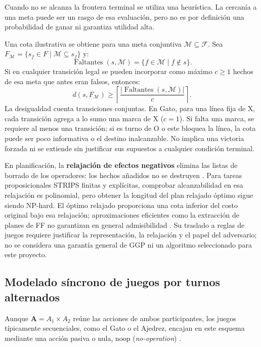 Cuando no se alcanza la frontera terminal se utiliza una heurística. La cercanía a una meta puede ser un rasgo de esa evaluación, pero no es por definición una probabilidad de ganar ni garantiza utilidad alta.

Una cota ilustrativa se obtiene para una meta conjuntiva $\mathcal M\subseteq\mathcal F$. Sea $F_{\mathcal M}=\{s_f\in F\mid\mathcal M\subseteq s_f\}$ y:
\begin{equation}
    \operatorname{Faltantes}(s,\mathcal M)=\{f\in\mathcal M\mid f\notin s\}.
    \label{eq:fluents-faltantes}
\end{equation}
Si en cualquier transición legal se pueden incorporar como máximo $c\ge1$ hechos de esa meta que antes eran falsos, entonces:
\begin{equation}
    d(s,F_{\mathcal M})\ge\left\lceil\frac{|\operatorname{Faltantes}(s,\mathcal M)|}{c}\right\rceil.
    \label{eq:cota-distancia-faltantes}
\end{equation}
La desigualdad cuenta transiciones conjuntas. En Gato, para una línea fija de X, cada transición agrega a lo sumo una marca de X ($c=1$). Si falta una marca, se requiere al menos una transición; si es turno de O o este bloquea la línea, la cota puede ser poco informativa o el destino inalcanzable. No implica una victoria forzada ni se extiende sin justificar sus supuestos a cualquier condición terminal.

En planificación, la \textbf{relajación de efectos negativos} elimina las listas de borrado de los operadores: los hechos añadidos no se destruyen \cite{BonetGeffner2001, HoffmannNebel2001FF}. Para tareas proposicionales STRIPS finitas y explícitas, comprobar alcanzabilidad en esa relajación es polinomial, pero obtener la longitud del plan relajado óptimo sigue siendo NP-hard. El óptimo relajado proporciona una cota inferior del costo original bajo esa relajación; aproximaciones eficientes como la extracción de planes de FF no garantizan en general admisibilidad \cite{HoffmannNebel2001FF}. Su traslado a reglas de juegos requiere justificar la representación, la relajación y el papel del adversario; no se considera una garantía general de GGP ni un algoritmo seleccionado para este proyecto.

\subsection{Modelado síncrono de juegos por turnos alternados}
\label{subsec:modelado_sincrono}

Aunque $\mathbf{A} = A_1 \times A_2$ reúne las acciones de ambos participantes, los juegos típicamente secuenciales, como el Gato o el Ajedrez, encajan en este esquema mediante una acción pasiva o nula, $\text{noop}$ (\textit{no-operation}) \cite{Love2008GDL, GeneserethThielscher2014}.

